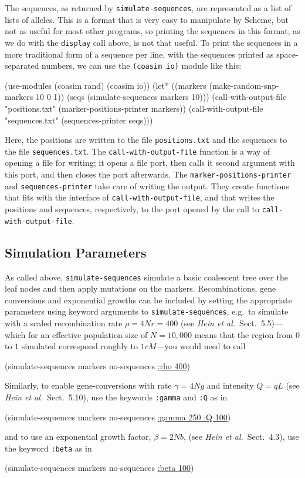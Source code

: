 \documentclass{manual}
\begin{document}
The sequences, as returned by \texttt{simulate-sequences}, are
represented as a list of lists of alleles.  This is a format that is
very easy to manipulate by Scheme, but not as useful for most other
programs, so printing the sequences in this format, as we do with the
\texttt{display} call above, is not that useful.  To print the
sequences in a more traditional form of a sequence per line, with the
sequences printed as space-separated numbers, we can use the
\texttt{(coasim io)} module like this:
\begin{code}
(use-modules (coasim rand) (coasim io))
(let* ((markers (make-random-snp-markers 10 0 1))
       (seqs (simulate-sequences markers 10)))
  (call-with-output-file "positions.txt" (marker-positions-printer markers))
  (call-with-output-file "sequences.txt" (sequences-printer seqs)))
\end{code}
Here, the positions are written to the file \texttt{positions.txt} and
the sequences to the file \texttt{sequences.txt}.  The
\texttt{call-with-output-file} function is a way of opening a file for
writing; it opens a file port, then calls it second argument with this
port, and then closes the port afterwards.  The
\texttt{marker-positions-printer} and \texttt{sequences-printer} take
care of writing the output.  They create functions that fits with the
interface of \texttt{call-with-output-file}, and that writes the
positions and sequences, respectively, to the port opened by
the call to \texttt{call-with-output-file}.


\subsection{Simulation Parameters}
\label{sec:simul-param}

As called above, \texttt{simulate-sequences} simulate a basic
coalescent tree over the leaf nodes and then apply mutations on the
markers.  Recombinations, gene conversions and exponential growths can
be included by setting the appropriate parameters using keyword
arguments to \texttt{simulate-sequences}, e.g.\ to simulate with a
scaled recombination rate $\rho=4Nr=400$ (see \emph{Hein et al.}\ 
Sect.~5.5)---which for an effective population size of $N=10,000$
means that the region from $0$ to $1$ simulated correspond roughly to
$1cM$---you would need to call
\begin{code}
(simulate-sequences markers no-sequences \underline{:rho 400})
\end{code}

Similarly, to enable gene-conversions with rate $\gamma=4Ng$ and
intensity $Q=qL$ (see \emph{Hein et al.}\ Sect.~5.10), use the
keywords \texttt{:gamma} and \texttt{:Q} as in
\begin{code}
(simulate-sequences markers no-sequences \underline{:gamma 250 :Q 100})
\end{code}
and to use an exponential growth factor, $\beta=2Nb$, (see \emph{Hein
  et al.}\ Sect.~4.3), use the keyword \texttt{:beta} as in
\begin{code}
(simulate-sequences markers no-sequences \underline{:beta 100})
\end{code}
\end{document}
